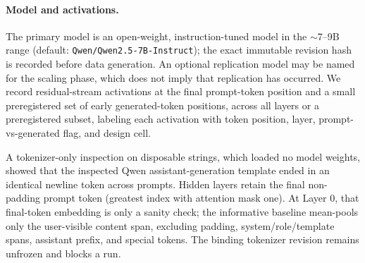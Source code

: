 \documentclass[11pt]{article}
\begin{document}
\paragraph{Model and activations.}
The primary model is an open-weight, instruction-tuned model in the $\sim$7--9B
range (default: \texttt{Qwen/Qwen2.5-7B-Instruct}); the exact immutable revision
hash is recorded before data generation. An optional replication model may be named
for the scaling phase, which does not imply that replication has occurred. We record
residual-stream activations at the final prompt-token position and a small
preregistered set of early generated-token positions, across all layers or a
preregistered subset, labeling each activation with token position, layer,
prompt-vs-generated flag, and design cell.

A tokenizer-only inspection on disposable strings, which loaded no model weights,
showed that the inspected Qwen assistant-generation template ended in an identical
newline token across prompts. Hidden layers retain the final non-padding prompt
token (greatest index with attention mask one). At Layer 0, that final-token
embedding is only a sanity check; the informative baseline mean-pools only the
user-visible content span, excluding padding, system/role/template spans,
assistant prefix, and special tokens. The binding tokenizer revision remains
unfrozen and blocks a run.
\end{document}
